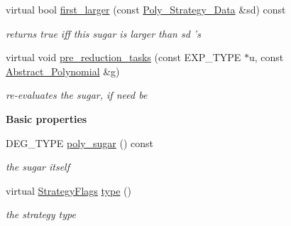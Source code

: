 \begin{DoxyCompactItemize}
\mbox{\label{class_poly___sugar___data_a9ccb90a43591e465479258bdf10b5b20}} 
virtual bool \hyperlink{class_poly___sugar___data_a9ccb90a43591e465479258bdf10b5b20}{first\+\_\+larger} (const \hyperlink{class_poly___strategy___data}{Poly\+\_\+\+Strategy\+\_\+\+Data} \&sd) const
\begin{DoxyCompactList}\small\item\em returns {\ttfamily true} iff {\ttfamily this} sugar is larger than {\ttfamily sd} 's \end{DoxyCompactList}\item 
\mbox{\label{class_poly___sugar___data_a1b2e8a7fe4fcd57555fa58e48620b2bf}} 
virtual void \hyperlink{class_poly___sugar___data_a1b2e8a7fe4fcd57555fa58e48620b2bf}{pre\+\_\+reduction\+\_\+tasks} (const E\+X\+P\+\_\+\+T\+Y\+PE $\ast$u, const \hyperlink{class_abstract___polynomial}{Abstract\+\_\+\+Polynomial} \&g)
\begin{DoxyCompactList}\small\item\em re-\/evaluates the sugar, if need be \end{DoxyCompactList}\end{DoxyCompactItemize}
\begin{Indent}\textbf{ Basic properties}\par
\begin{DoxyCompactItemize}
\item 
\mbox{\label{class_poly___sugar___data_a3b6ef678b640a3138e43882b9d2dca5f}} 
D\+E\+G\+\_\+\+T\+Y\+PE \hyperlink{class_poly___sugar___data_a3b6ef678b640a3138e43882b9d2dca5f}{poly\+\_\+sugar} () const
\begin{DoxyCompactList}\small\item\em the sugar itself \end{DoxyCompactList}\item 
\mbox{\label{class_poly___sugar___data_a36704dfc77b9007bf5f249e55bfde0ef}} 
virtual \hyperlink{group__strategygroup_ga0ee6c8e033547330e6b89929730007f4}{Strategy\+Flags} \hyperlink{class_poly___sugar___data_a36704dfc77b9007bf5f249e55bfde0ef}{type} ()
\begin{DoxyCompactList}\small\item\em the strategy type \end{DoxyCompactList}\end{DoxyCompactItemize}
\end{Indent}
